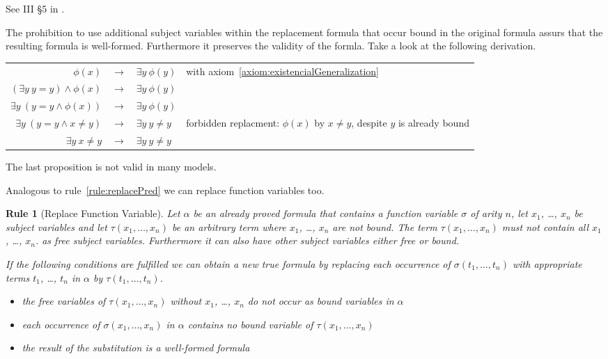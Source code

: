 \documentclass[a4paper,german,10pt,twoside]{book}
\newtheorem{rul}{Rule}
\theoremstyle{definition}
\theoremstyle{remark}
\begin{document}
See III \S 5 in \cite{hilback}.

\par
The prohibition to use additional subject variables within the replacement formula that occur bound in the original formula assurs that the resulting formula is well-formed. Furthermore it preserves the validity of the formla. Take a look at the following derivation.

\par
\begin{tabularx}{\linewidth}{rclX}
  $ \phi(x)$                             & $\rightarrow$ & $\exists y \ \phi(y)$  
    & with axiom~\ref{axiom:existencialGeneralization} \\
  $ (\exists y \ y = y) \land \phi(x)$   & $\rightarrow$ & $\exists y \ \phi(y)$  
    &  \\
  $ \exists y \ (y = y \land \phi(x))$   & $\rightarrow$ & $\exists y \ \phi(y)$  
    &  \\
  $ \exists y \ (y = y \land x \neq y)$  & $\rightarrow$ & $\exists y \ y \neq y$  
    & forbidden replacment: $\phi(x)$ by $x \neq y$, despite $y$ is already bound \\
  $ \exists y \  x \neq y$  & $\rightarrow$ & $\exists y \ y \neq y$  
    &
\end{tabularx}

\par
The last proposition is not valid in many models.


\par
Analogous to rule~\ref{rule:replacePred} we can replace function variables too.

\begin{rul}[Replace Function Variable]
\label{rule:replaceFunct} \hypertarget{rule:replaceFunct}{}
Let $\alpha$ be an already proved formula that contains a function variable $\sigma$ of arity $n$, let $x_1$, \ldots, $x_n$ be subject variables and let $\tau(x_1, \ldots, x_n)$ be an arbitrary term where $x_1$, \ldots, $x_n$ are not bound. The term $\tau(x_1, \ldots, x_n)$ must not contain all $x_1$, \ldots, $x_n$. as free subject variables. Furthermore it can also have other subject variables either free or bound. 

If the following conditions are fulfilled we can obtain a new true formula by replacing each occurrence of $\sigma(t_1, \ldots, t_n)$ with appropriate terms $t_1$, \ldots, $t_n$ in $\alpha$ by $\tau(t_1, \ldots, t_n)$.

\begin{itemize}

\item 
the free variables of $\tau(x_1, \ldots, x_n)$ without $x_1$, \ldots, $x_n$ do not occur as bound variables in $\alpha$

\item
each occurrence of $\sigma(x_1, \ldots, x_n)$ in $\alpha$ contains no bound variable of $\tau(x_1, \ldots, x_n)$

\item
the result of the substitution is a well-formed formula

                  
\end{itemize}
\end{rul}
\end{document}
